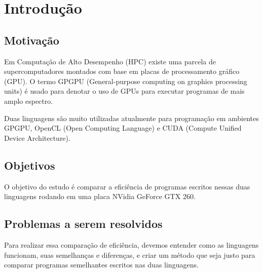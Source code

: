 \section{Introdução}
\subsection{Motivação}
Em Computação de Alto Desempenho (HPC) existe uma parcela de supercomputadores montados com base em placas
de processamento gráfico (GPU). O termo GPGPU (General-purpose computing on graphics processing units) é
usado para denotar o uso de GPUs para executar programas de mais amplo espectro.

Duas linguagens são muito utilizadas atualmente para programação em ambientes GPGPU, OpenCL (Open Computing Language) 
e CUDA (Compute Unified Device Architecture).

\subsection{Objetivos}
O objetivo do estudo é comparar a eficiência de programas escritos nessas duas linguagens rodando em uma placa NVidia GeForce GTX 260.
\subsection{Problemas a serem resolvidos}
Para realizar essa comparação de eficiência, devemos entender como as linguagens funcionam, suas semelhanças e
diferenças, e criar um método que seja justo para comparar programas semelhantes escritos nas duas linguagens.
